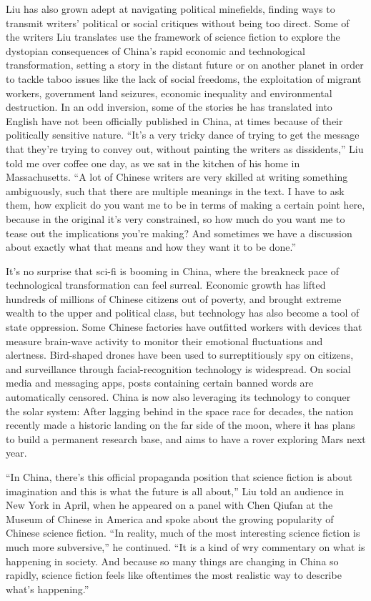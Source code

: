 Liu has also grown adept at navigating political minefields, finding
ways to transmit writers' political or social critiques without being
too direct. Some of the writers Liu translates use the framework of
science fiction to explore the dystopian consequences of China's rapid
economic and technological transformation, setting a story in the
distant future or on another planet in order to tackle taboo issues like
the lack of social freedoms, the exploitation of migrant workers,
government land seizures, economic inequality and environmental
destruction. In an odd inversion, some of the stories he has translated
into English have not been officially published in China, at times
because of their politically sensitive nature. ``It's a very tricky
dance of trying to get the message that they're trying to convey out,
without painting the writers as dissidents,'' Liu told me over coffee
one day, as we sat in the kitchen of his home in Massachusetts. ``A lot
of Chinese writers are very skilled at writing something ambiguously,
such that there are multiple meanings in the text. I have to ask them,
how explicit do you want me to be in terms of making a certain point
here, because in the original it's very constrained, so how much do you
want me to tease out the implications you're making? And sometimes we
have a discussion about exactly what that means and how they want it to
be done.''

It's no surprise that sci-fi is booming in China, where the breakneck
pace of technological transformation can feel surreal. Economic growth
has lifted hundreds of millions of Chinese citizens out of poverty, and
brought extreme wealth to the upper and political class, but technology
has also become a tool of state oppression. Some Chinese factories have
outfitted workers with devices that measure brain-wave activity to
monitor their emotional fluctuations and alertness. Bird-shaped drones
have been used to surreptitiously spy on citizens, and surveillance
through facial-recognition technology is widespread. On social media and
messaging apps, posts containing certain banned words are automatically
censored. China is now also leveraging its technology to conquer the
solar system: After lagging behind in the space race for decades, the
nation recently made a historic landing on the far side of the moon,
where it has plans to build a permanent research base, and aims to have
a rover exploring Mars next year.

``In China, there's this official propaganda position that science
fiction is about imagination and this is what the future is all about,''
Liu told an audience in New York in April, when he appeared on a panel
with Chen Qiufan at the Museum of Chinese in America and spoke about the
growing popularity of Chinese science fiction. ``In reality, much of the
most interesting science fiction is much more subversive,'' he
continued. ``It is a kind of wry commentary on what is happening in
society. And because so many things are changing in China so rapidly,
science fiction feels like oftentimes the most realistic way to describe
what's happening.''

